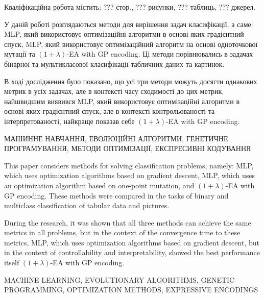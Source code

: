 
\abstractUkr

Кваліфікаційна робота містить: ??? стор., ??? рисунки, ??? таблиць, ??? джерел.

У даній роботі розглядаються методи для вирішення задач класифікації, а саме: MLP, який використовує оптимізаційні алгоритми в основі яких градієнтний спуск, MLP, який використовує оптимізаційний алгоритм на основі одноточкової мутації та $(1+\lambda)$-EA with GP encoding. Ці методи порівнювались в задачах бінарної та мультикласової класифікації табличних даних та картинок.

В ході дослідження було показано, що усі три методи можуть досягти однакових метрик в усіх задачах, але в контексті часу сходимості до цих метрик, найшвидшим виявився MLP, який використовує оптимізаційні алгоритми в основі яких градієнтний спуск, але в контексті контрольованості та інтерпретованості, найкраще показав себе $(1+\lambda)$-EA with GP encoding.

\MakeUppercase{МАШИННЕ НАВЧАННЯ, ЕВОЛЮЦІЙНІ АЛГОРИТМИ, ГЕНЕТИЧНЕ ПРОГРАМУВАННЯ, МЕТОДИ ОПТИМІЗАЦІЇ, ЕКСПРЕСИВНІ КОДУВАННЯ}


%

\abstractEng

This paper considers methods for solving classification problems, namely: MLP, which uses optimization algorithms based on gradient descent, MLP, which uses an optimization algorithm based on one-point mutation, and $(1+\lambda)$-EA with GP encoding. These methods were compared in the tasks of binary and multiclass classification of tabular data and pictures.

During the research, it was shown that all three methods can achieve the same metrics in all problems, but in the context of the convergence time to these metrics, MLP, which uses optimization algorithms based on gradient descent, but in the context of controllability and interpretability, showed the best performance itself $(1+\lambda)$-EA with GP encoding.

\MakeUppercase{MACHINE LEARNING, EVOLUTIONARY ALGORITHMS, GENETIC PROGRAMMING, OPTIMIZATION METHODS, EXPRESSIVE ENCODINGS}

\clearpage